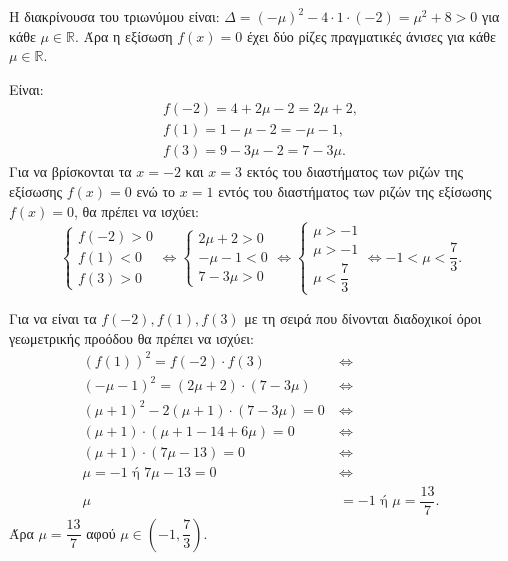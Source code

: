 
\begin{alist}
\item Η διακρίνουσα του τριωνύμου είναι:
$\Delta = (-\mu)^2 - 4 \cdot 1 \cdot (-2) = \mu^2 + 8 > 0$ για κάθε $\mu \in \mathbb{R}$.
Άρα η εξίσωση $f(x) = 0$ έχει δύο ρίζες πραγματικές άνισες για κάθε $\mu \in \mathbb{R}$.

\item Είναι:
\begin{gather*}
f(-2) = 4 + 2\mu - 2 = 2\mu + 2, \\
f(1) = 1 - \mu - 2 = -\mu - 1, \\
f(3) = 9 - 3\mu - 2 = 7 - 3\mu.
\end{gather*}
Για να βρίσκονται τα $x = -2$ και $x = 3$ εκτός του διαστήματος των ριζών της εξίσωσης
$f(x) = 0$ ενώ το $x = 1$ εντός του διαστήματος των ριζών της εξίσωσης $f(x) = 0$, θα 
πρέπει να ισχύει:
\[\begin{cases} f(-2) > 0 \\ f(1) < 0 \\ f(3) > 0 \end{cases} \Leftrightarrow \begin{cases} 2\mu + 2 > 0 \\ -\mu - 1 < 0 \\ 7 - 3\mu > 0 \end{cases} \Leftrightarrow \begin{cases} \mu > -1 \\ \mu > -1 \\ \mu < \dfrac{7}{3} \end{cases} \Leftrightarrow -1 < \mu < \dfrac{7}{3}.\]

\item 
\begin{rlist}
\item Για να είναι τα $f(-2), f(1), f(3)$ με τη σειρά που δίνονται διαδοχικοί όροι
γεωμετρικής προόδου θα πρέπει να ισχύει:
\begin{align*}
(f(1))^2 = f(-2) \cdot f(3) \ &\Leftrightarrow \\
(-\mu - 1)^2 = (2\mu + 2) \cdot (7 - 3\mu) \ &\Leftrightarrow \\
(\mu + 1)^2 - 2(\mu + 1) \cdot (7 - 3\mu) = 0 \ &\Leftrightarrow \\
(\mu + 1) \cdot (\mu + 1 - 14 + 6\mu) = 0 \ &\Leftrightarrow \\
(\mu + 1) \cdot (7\mu - 13) = 0 \ &\Leftrightarrow \\
\mu = -1 \text{ ή } 7\mu - 13 = 0 \ &\Leftrightarrow \\
\mu &= -1 \text{ ή } \mu = \dfrac{13}{7}.
\end{align*}
Άρα $\mu = \dfrac{13}{7}$ αφού $\mu \in \left(-1, \dfrac{7}{3}\right)$.


\end{rlist}
\end{alist}
